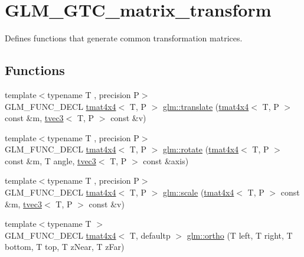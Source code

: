 \hypertarget{group__gtc__matrix__transform}{}\section{G\+L\+M\+\_\+\+G\+T\+C\+\_\+matrix\+\_\+transform}
\label{group__gtc__matrix__transform}


Defines functions that generate common transformation matrices.  


\subsection*{Functions}
\begin{DoxyCompactItemize}
\item 
{\footnotesize template$<$typename T , precision P$>$ }\\G\+L\+M\+\_\+\+F\+U\+N\+C\+\_\+\+D\+E\+CL \hyperlink{structglm_1_1tmat4x4}{tmat4x4}$<$ T, P $>$ \hyperlink{group__gtc__matrix__transform_gaee134ab77c6c5548a6ebf4e8e476c6ed}{glm\+::translate} (\hyperlink{structglm_1_1tmat4x4}{tmat4x4}$<$ T, P $>$ const \&m, \hyperlink{structglm_1_1tvec3}{tvec3}$<$ T, P $>$ const \&v)
\item 
{\footnotesize template$<$typename T , precision P$>$ }\\G\+L\+M\+\_\+\+F\+U\+N\+C\+\_\+\+D\+E\+CL \hyperlink{structglm_1_1tmat4x4}{tmat4x4}$<$ T, P $>$ \hyperlink{group__gtc__matrix__transform_ga161b1df124348f232d994ba7958e4815}{glm\+::rotate} (\hyperlink{structglm_1_1tmat4x4}{tmat4x4}$<$ T, P $>$ const \&m, T angle, \hyperlink{structglm_1_1tvec3}{tvec3}$<$ T, P $>$ const \&axis)
\item 
{\footnotesize template$<$typename T , precision P$>$ }\\G\+L\+M\+\_\+\+F\+U\+N\+C\+\_\+\+D\+E\+CL \hyperlink{structglm_1_1tmat4x4}{tmat4x4}$<$ T, P $>$ \hyperlink{group__gtc__matrix__transform_ga8f062fcc07e2445500793f2803afebb0}{glm\+::scale} (\hyperlink{structglm_1_1tmat4x4}{tmat4x4}$<$ T, P $>$ const \&m, \hyperlink{structglm_1_1tvec3}{tvec3}$<$ T, P $>$ const \&v)
\item 
{\footnotesize template$<$typename T $>$ }\\G\+L\+M\+\_\+\+F\+U\+N\+C\+\_\+\+D\+E\+CL \hyperlink{structglm_1_1tmat4x4}{tmat4x4}$<$ T, defaultp $>$ \hyperlink{group__gtc__matrix__transform_ga65280251de6e38580110a0577a43d8f8}{glm\+::ortho} (T left, T right, T bottom, T top, T z\+Near, T z\+Far)
\item 

\end{DoxyCompactItemize}
